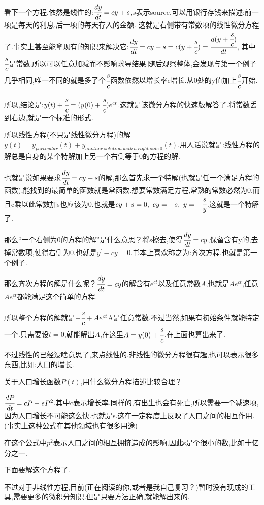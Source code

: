 \documentclass[UTF8,12pt]{ctexbook}
\newcommand{\derivative}{^\prime}
\begin{document}
{{{{  看下一个方程,依然是线性的:$\cfrac{dy}{dt} = cy + s$,$s$表示source,可以用银行存钱来描述:前一项是每天的利息,后一项的每天存入的金额.
  这就是右侧带有常数项的线性微分方程了.事实上甚至能拿现有的知识来解决它:$\cfrac{dy}{dt} = cy + s = c(y + \cfrac{s}{c}) = \cfrac{d(y + \cfrac{s}{c})}{dt}$, 其中$\cfrac{s}{c}$是常数,所以可以任意加减而不影响求导结果.随后观察整体,会发现与第一个例子几乎相同,唯一不同的就是多了个$\cfrac{s}{c}$函数依然以增长率c增长.从0处的y值加上$\cfrac{s}{c}$开始.

  所以,结论是:$y(t) + \cfrac{s}{c} = (y(0) + \cfrac{s}{c})e^{ct}$.这就是该微分方程的快速版解答了.将常数丢到右边,就是一个标准的形式.

  所以线性方程(不只是线性微分方程)的解$y(t) = y_{particular}(t) + y_{another\ solution\ with\ a\ right\ side\ 0}(t)$.用人话说就是:线性方程的解总是自身的某个特解加上另一个右侧等于0的方程的解.

  也就是说如果要求$\cfrac{dy}{dt} = cy + s$的解,那么首先求一个特解(也就是任一个满足方程的函数),能找到的最简单的函数就是常函数.想要常数满足方程,常熟的常数必然为0,而且c乘以此常数加s也应该为0.也就是$cy + s = 0,\ cy = -s, \ y = -\cfrac{s}{y}$.这就是一个特解了.

  那么“一个右侧为0的方程的解”是什么意思？将s擦去,使得$\cfrac{dy}{dt} = cy$,保留含有y的,去掉常数项,使得右侧为0.也就是$y\derivative - cy = 0$.书本上喜欢称之为:齐次方程.也就是第一个例子.

  那么齐次方程的解是什么呢？$\cfrac{dy}{dt} = cy$的解含有$e^{ct}$以及任意常数$A$,也就是$Ae^{ct}$,任意$Ae^{ct}$都能满足这个简单的方程.

  所以整个方程的解就是$-\cfrac{s}{c} + Ae^{ct}$A是任意常数.不过当然,如果有初始条件就能特定一个.只需要设$t = 0$,就能解出$A$,在这里$A = y(0) + \cfrac{s}{c}$.在上面也算出来了.

  不过线性的已经没啥意思了,来点线性的.非线性的微分方程很有趣,也可以表示很多东西,比如:人口的增长.

  关于人口增长函数$P(t)$,用什么微分方程描述比较合理？

  $\cfrac{dP}{dt} = cP - sP^2$.其中c表示增长率.同样的,有出生也会有死亡,所以需要一个减速项,因为人口增长不可能这么快.也就是s.这在一定程度上反映了人口之间的相互作用.(事实上这种公式在其他领域也有很多用途)

  在这个公式中$p^2$表示人口之间的相互拥挤造成的影响,因此s是个很小的数,比如十亿分之一.

  下面要解这个方程了.

  不过对于非线性方程,目前(正在阅读的你,或者是我自己复习？)暂时没有现成的工具,需要更多的微积分知识.但是只要方法正确,就能解出来的.

}}}}
\end{document}
